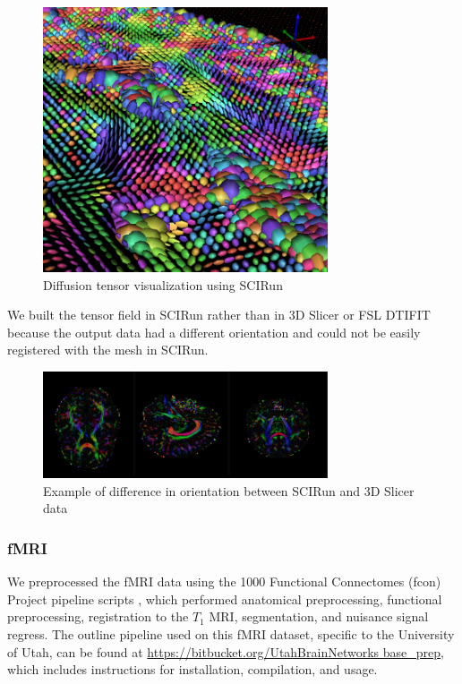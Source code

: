 \begin{figure}[H]
\begin{center}
\includegraphics[width=0.75\textwidth]{Figures/DTI_2.png}
\caption{Diffusion tensor visualization using SCIRun}
\label{fig:tensorvis2}
\end{center}
\end{figure}

We built the tensor field in SCIRun rather than in 3D Slicer \cite{ref:slicer} or FSL DTIFIT because the output data had a different orientation and could not be easily registered with the mesh in SCIRun.

\begin{figure}[H]
\begin{center}
\includegraphics[width=0.75\textwidth]{Figures/backwards.png}
\caption{Example of difference in orientation between SCIRun and 3D
  Slicer data}
\label{fig:backwards}
\end{center}
\end{figure}

\subsubsection{fMRI}
\label{sec:fmripre}

We preprocessed the fMRI data using the 1000 Functional Connectomes (fcon) Project pipeline scripts \cite{ref:fcon}, which performed anatomical preprocessing, functional preprocessing, registration to the $T_1$ MRI, segmentation, and nuisance signal regress. The outline pipeline used on this fMRI dataset, specific to the University of Utah, can be found at \url{https://bitbucket.org/UtahBrainNetworks base_prep}, which includes instructions for installation, compilation, and usage.

